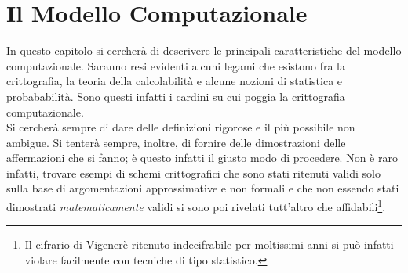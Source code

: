 \documentclass[a4paper,openright,twoside,12pt]{report}
\begin{document}
\chapter{Il Modello Computazionale}
In questo capitolo si cercher\`a di descrivere le principali caratteristiche del modello computazionale. Saranno resi evidenti alcuni legami che
esistono fra la crittografia, la teoria della calcolabilit\`a e alcune nozioni di statistica e probababilit\`a. Sono questi infatti i cardini su cui poggia la crittografia
computazionale.\\ 
Si cercher\`a sempre di dare delle definizioni rigorose e il pi\`u possibile non ambigue. 
Si tenter\`a sempre, inoltre, di fornire delle dimostrazioni delle affermazioni che si fanno; \`e questo infatti il giusto modo di procedere.
Non \`e raro infatti, trovare esempi di schemi crittografici che sono stati ritenuti validi solo sulla base di argomentazioni approssimative e non formali e 
che non essendo stati dimostrati \emph{matematicamente} validi si sono poi rivelati tutt'altro che affidabili\footnote{Il cifrario di Vigener\`e ritenuto indecifrabile per 
moltissimi anni si può infatti violare facilmente con tecniche di tipo statistico.}.
\end{document}
